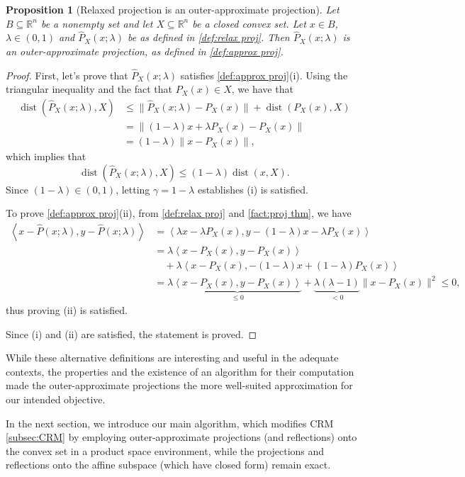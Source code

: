 \documentclass[smallextended,numbook,nospthms]{svjour3}
\theoremstyle{plain}
\newtheorem{proposition}[theorem]{Proposition}
\theoremstyle{definition}
\def\RR{\mathds R}
\DeclareMathOperator{\dist}{dist}
\newcommand{\scal}[2]{\left\langle{#1},{#2}  \right\rangle}
\begin{document}
\begin{proposition}[Relaxed projection is an outer-approximate projection]
	Let $B \subseteq \RR^n$ be a nonempty set and let $X \subseteq \RR^n$ be a closed convex set. Let $x \in B$, $\lambda \in (0,1)$ and $\hat{P}_{X}(x; \lambda)$ be as defined in \cref{def:relax proj}. Then $\hat{P}_{X}(x; \lambda)$ is an outer-approximate projection, as defined in \cref{def:approx proj}.
\end{proposition}
\begin{proof}
	First, let's prove that $\hat{P}_{X}(x;\lambda)$ satisfies \cref{def:approx proj}(i). Using the triangular inequality and the fact that $P_{X}(x) \in X$, we have that
	\begin{align}
			\dist(\hat{P}_{X}(x;\lambda),X) &\leq \|\hat{P}_{X}(x;\lambda)-P_{X}(x)\| + \dist(P_{X}(x),X) \\
			&= \|(1-\lambda)x+\lambda P_{X}(x)-P_{X}(x)\| \\
			&= (1-\lambda)\|x-P_{X}(x)\|,
	\end{align}
	which implies that
	\[
	\dist(\hat{P}_{X}(x;\lambda),X) \leq (1-\lambda)\dist(x,X).
	\]
	Since $(1-\lambda) \in (0,1)$, letting $\gamma=1-\lambda$ establishes (i) is satisfied.
	
	To prove \cref{def:approx proj}(ii), from \cref{def:relax proj} and \cref{fact:proj thm}, we have 
	\begin{align}
		\scal{x-\hat{P}(x;\lambda)}{y-\hat{P}(x;\lambda)}
		&=\scal{\lambda x - \lambda P_{X}(x)}{y - (1-\lambda)x -\lambda P_{X}(x)} \\
		&=\lambda\scal{x-P_{X}(x)}{y-P_{X}(x)} \\
		&\quad+\lambda\scal{x-P_{X}(x)}{-(1-\lambda)x+(1-\lambda)P_{X}(x)} \\
		&=\lambda\underbrace{\scal{x-P_{X}(x)}{y-P_{X}(x)}}_{\leq 0}+\underbrace{\lambda(\lambda-1)}_{<0}\|x-P_{X}(x)\|^2 \leq 0,		
	\end{align}
	thus proving (ii) is satisfied.
	
	Since (i) and (ii) are satisfied, the statement is proved.
\end{proof}

While these alternative definitions are interesting and useful in the adequate contexts, the properties and the existence of an algorithm for their computation made the outer-approximate projections the more well-suited approximation for our intended objective.

In the next section, we introduce our main algorithm, which modifies CRM \cref{subsec:CRM} by employing outer-approximate projections (and reflections) onto the convex set in a product space environment, while the projections and reflections onto the affine subspace (which have closed form) remain exact.
\end{document}
